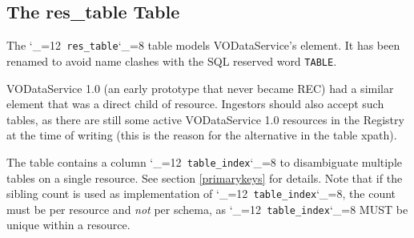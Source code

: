 \documentclass[11pt,a4paper]{ivoa}
\makeatletter
\def\rtent#1{\texttt{\color{rtcolor}\verb|#1|}}
\def\makeunderscoreletter{\catcode`\_=12}
\def\makeunderscoresubscript{\catcode`\_=8}
\def\rtent{\makeunderscoreletter\relax\rt@nt}
\def\rt@nt#1{\texttt{\color{rtcolor} #1}\makeunderscoresubscript{}}
\makeatother
\begin{document}
\subsection{The res\_table Table}

\label{table_res_table}

The \rtent{res_table} table models VODataService's
 element.  It has been renamed to avoid name clashes
with the SQL reserved word \texttt{TABLE}.

VODataService 1.0 (an early prototype that never became REC)
had a similar element that was a direct child of
resource.  Ingestors should also accept such tables, as there are still
some active VODataService 1.0 resources in the Registry at the time
of writing (this is the reason for the alternative in the table xpath).

The table contains a column \rtent{table_index} to disambiguate
multiple tables on a single resource.  See section \ref{primarykeys} for details.  Note that if the sibling
count is used as implementation of \rtent{table_index}, the count
must be per resource and \emph{not} per schema, as
\rtent{table_index} MUST be unique within a resource.


\end{document}
